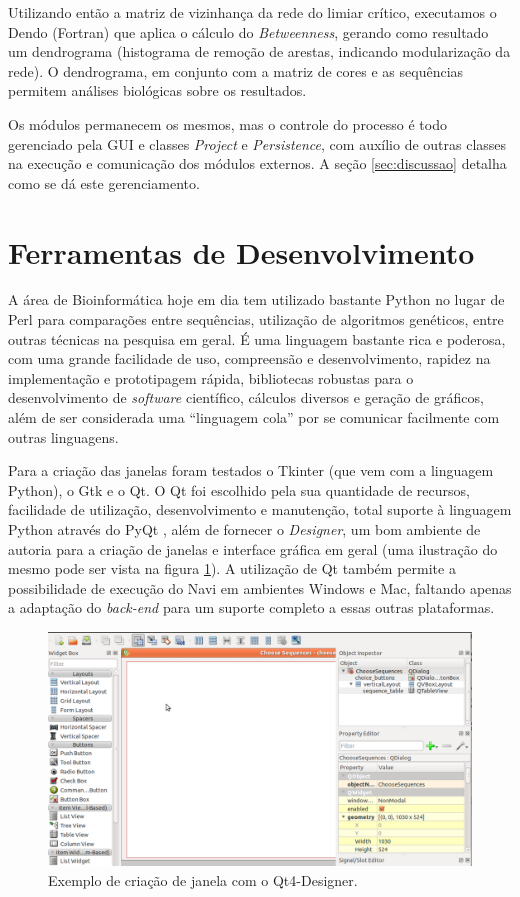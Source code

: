 Utilizando então a matriz de vizinhança da rede do limiar crítico, executamos o Dendo (Fortran) que aplica o cálculo do \textit{Betweenness}, gerando como
resultado um dendrograma (histograma de remoção de arestas, indicando modularização da rede). O dendrograma, em conjunto com a matriz de cores e as sequências
permitem análises biológicas sobre os resultados.

Os módulos permanecem os mesmos, mas o controle do processo é todo gerenciado pela GUI e classes \textit{Project} e \textit{Persistence}, com auxílio de
outras classes na execução e comunicação dos módulos externos. A seção \ref{sec:discussao} detalha como se dá este gerenciamento.

\section{Ferramentas de Desenvolvimento} \label{sec:ferramentas}

A área de Bioinformática hoje em dia tem utilizado bastante Python \cite{python} no lugar de Perl para comparações entre sequências, utilização de algoritmos
genéticos, entre outras técnicas na pesquisa em geral. É uma linguagem bastante rica e poderosa, com uma grande facilidade de uso, compreensão e
desenvolvimento, rapidez na implementação e prototipagem rápida, bibliotecas robustas para o desenvolvimento de \textit{software} científico, cálculos
diversos e geração de gráficos, além de ser considerada uma ``linguagem cola'' por se comunicar facilmente com outras linguagens.

Para a criação das janelas foram testados o Tkinter (que vem com a linguagem Python), o Gtk e o Qt. O Qt foi escolhido pela sua quantidade de recursos,
facilidade de utilização, desenvolvimento e manutenção, total suporte à linguagem Python através do PyQt \cite{pyqt}, além de fornecer o \textit{Designer},
um bom ambiente de autoria para a criação de janelas e interface gráfica em geral (uma ilustração do mesmo pode ser vista na figura \ref{fig:designer}).
A utilização de Qt também permite a possibilidade de execução do Navi em ambientes Windows e Mac, faltando apenas a adaptação do \textit{back-end} para um
suporte completo a essas outras plataformas.

\begin{figure}
\centering
\includegraphics[scale=0.38]{designer}
\caption{Exemplo de criação de janela com o Qt4-Designer.}
\label{fig:designer}
\end{figure}

